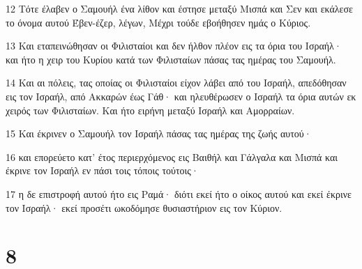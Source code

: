 \par 12 Τότε έλαβεν ο Σαμουήλ ένα λίθον και έστησε μεταξύ Μισπά και Σεν και εκάλεσε το όνομα αυτού Έβεν-έζερ, λέγων, Μέχρι τούδε εβοήθησεν ημάς ο Κύριος.
\par 13 Και εταπεινώθησαν οι Φιλισταίοι και δεν ήλθον πλέον εις τα όρια του Ισραήλ· και ήτο η χειρ του Κυρίου κατά των Φιλισταίων πάσας τας ημέρας του Σαμουήλ.
\par 14 Και αι πόλεις, τας οποίας οι Φιλισταίοι είχον λάβει από του Ισραήλ, απεδόθησαν εις τον Ισραήλ, από Ακκαρών έως Γάθ· και ηλευθέρωσεν ο Ισραήλ τα όρια αυτών εκ χειρός των Φιλισταίων. Και ήτο ειρήνη μεταξύ Ισραήλ και Αμορραίων.
\par 15 Και έκρινεν ο Σαμουήλ τον Ισραήλ πάσας τας ημέρας της ζωής αυτού·
\par 16 και επορεύετο κατ' έτος περιερχόμενος εις Βαιθήλ και Γάλγαλα και Μισπά και έκρινε τον Ισραήλ εν πάσι τοις τόποις τούτοις·
\par 17 η δε επιστροφή αυτού ήτο εις Ραμά· διότι εκεί ήτο ο οίκος αυτού και εκεί έκρινε τον Ισραήλ· εκεί προσέτι ωκοδόμησε θυσιαστήριον εις τον Κύριον.

\chapter{8}

